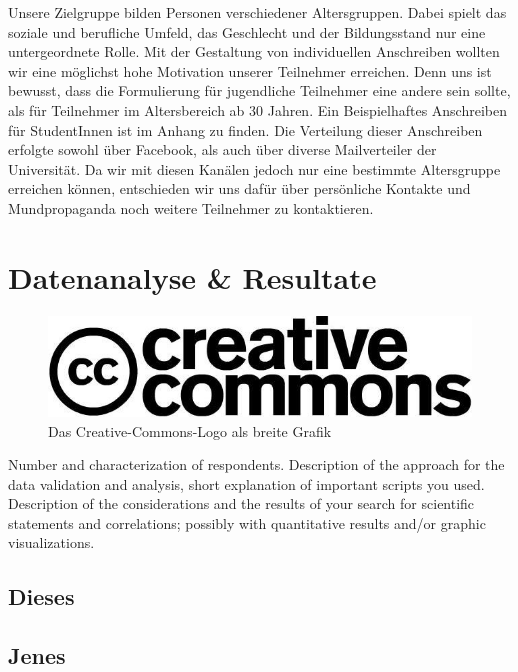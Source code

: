 \documentclass[de]{agse-empir-report}\usepackage[]{graphicx}\usepackage[]{color}
\begin{document}
Unsere Zielgruppe bilden Personen verschiedener Altersgruppen. Dabei spielt das soziale und berufliche Umfeld, das Geschlecht und der Bildungsstand nur eine untergeordnete Rolle. Mit der Gestaltung von individuellen Anschreiben wollten wir eine möglichst hohe Motivation unserer Teilnehmer erreichen. Denn uns ist bewusst, dass die Formulierung für jugendliche Teilnehmer eine andere sein sollte, als für Teilnehmer im Altersbereich ab 30 Jahren. Ein Beispielhaftes Anschreiben für StudentInnen ist im Anhang zu finden. Die Verteilung dieser Anschreiben erfolgte sowohl über Facebook, als auch über diverse Mailverteiler der Universität. Da wir mit diesen Kanälen jedoch nur eine bestimmte Altersgruppe erreichen können, entschieden wir uns dafür über persönliche Kontakte und Mundpropaganda noch weitere Teilnehmer zu kontaktieren.

\section[pb]{Datenanalyse \& Resultate} \label{analyse}

\begin{figure}
    \includegraphics[width=\linewidth]{creative_commons.jpg}
    \caption{Das Creative-Commons-Logo als breite Grafik}
\end{figure}

Number and characterization of respondents.
Description of the approach for the data validation and
analysis, short explanation of important scripts you used.
Description of the considerations and the results of your search for
scientific statements and correlations; possibly with quantitative
results and/or graphic visualizations.

\lipsum[5]


\subsection{Dieses}
\lipsum[6]


\subsection[mds]{Jenes}
\lipsum[7-8]
\end{document}
